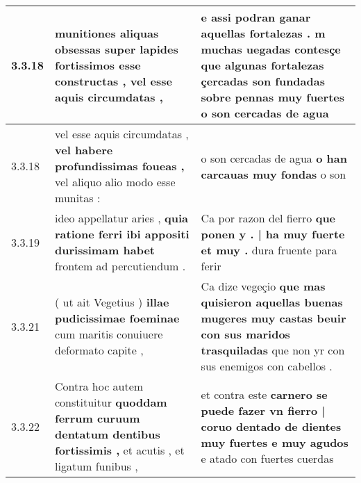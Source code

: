 \begin{tabular}{|p{1cm}|p{6.5cm}|p{6.5cm}|}
3.3.18 & munitiones aliquas obsessas \textbf{ super lapides fortissimos esse constructas , } vel esse aquis circumdatas , & e assi podran ganar aquellas fortalezas . \textbf{ m muchas uegadas contesçe que algunas fortalezas çercadas son fundadas sobre pennas muy fuertes } o son cercadas de agua \\\hline
3.3.18 & vel esse aquis circumdatas , \textbf{ vel habere profundissimas foueas , } vel aliquo alio modo esse munitas : & o son cercadas de agua \textbf{ o han carcauas muy fondas } o son \\\hline
3.3.19 & ideo appellatur aries , \textbf{ quia ratione ferri ibi appositi durissimam habet } frontem ad percutiendum . & Ca por razon del fierro \textbf{ que ponen y . | ha muy fuerte et muy . } dura fruente para ferir \\\hline
3.3.21 & ( ut ait Vegetius ) \textbf{ illae pudicissimae foeminae } cum maritis conuiuere deformato capite , & Ca dize vegeçio \textbf{ que mas quisieron aquellas buenas mugeres muy castas beuir con sus maridos trasquiladas } que non yr con sus enemigos con cabellos . \\\hline
3.3.22 & Contra hoc autem constituitur \textbf{ quoddam ferrum curuum dentatum dentibus fortissimis , } et acutis , et ligatum funibus , & et contra este \textbf{ carnero se puede fazer vn fierro | coruo dentado de dientes muy fuertes e muy agudos } e atado con fuertes cuerdas \\\hline

\end{tabular}
